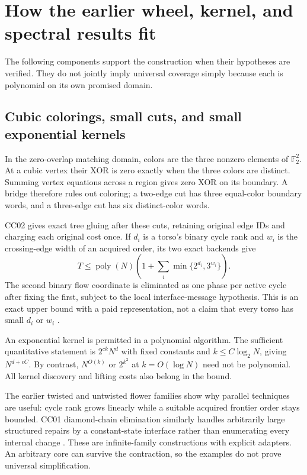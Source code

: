 \documentclass[11pt,letterpaper]{article}
\theoremstyle{definition}
\newcommand{\F}{\mathbb F_2}
\newcommand{\poly}{\operatorname{poly}}
\begin{document}
\section{How the earlier wheel, kernel, and spectral results fit}

The following components support the construction when their hypotheses are verified. They do not jointly imply universal coverage simply because each is polynomial on its own promised domain.

\subsection{Cubic colorings, small cuts, and small exponential kernels}

In the zero-overlap matching domain, colors are the three nonzero elements of $\F^2$. At a cubic vertex their XOR is zero exactly when the three colors are distinct. Summing vertex equations across a region gives zero XOR on its boundary. A bridge therefore rules out coloring; a two-edge cut has three equal-color boundary words, and a three-edge cut has six distinct-color words.

CC02 gives exact tree gluing after these cuts, retaining original edge IDs and charging each original cost once. If $d_i$ is a torso's binary cycle rank and $w_i$ is the crossing-edge width of an acquired order, its two exact backends give
\[
T\le\poly(N)\left(1+\sum_i\min\{2^{d_i},3^{w_i}\}\right).
\]
The second binary flow coordinate is eliminated as one phase per active cycle after fixing the first, subject to the local interface-message hypothesis. This is an exact upper bound with a paid representation, not a claim that every torso has small $d_i$ or $w_i$ \cite{cc02}.

An exponential kernel is permitted in a polynomial algorithm. The sufficient quantitative statement is $2^{c k}N^d$ with fixed constants and $k\le C\log_2 N$, giving $N^{d+cC}$. By contrast, $N^{O(k)}$ or $2^{k^2}$ at $k=O(\log N)$ need not be polynomial. All kernel discovery and lifting costs also belong in the bound.

The earlier twisted and untwisted flower families show why parallel techniques are useful: cycle rank grows linearly while a suitable acquired frontier order stays bounded. CC01 diamond-chain elimination similarly handles arbitrarily large structured repairs by a constant-state interface rather than enumerating every internal change \cite{cc01,cc02}. These are infinite-family constructions with explicit adapters. An arbitrary core can survive the contraction, so the examples do not prove universal simplification.
\end{document}
